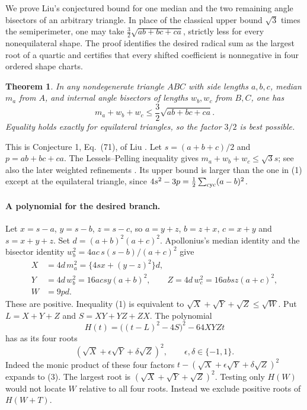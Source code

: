 \documentclass[11pt,a4paper]{article}
\numberwithin{equation}{section}
\newtheorem{theorem}{Theorem}[section]
\theoremstyle{definition}
\theoremstyle{remark}
\newenvironment{sectionabstract}{\par\smallskip\begingroup\small\noindent}{\par\endgroup\medskip}
\begin{document}
\begin{sectionabstract}
We prove Liu's conjectured bound for one median and the two remaining angle bisectors of an arbitrary triangle. In place of the classical upper bound $\sqrt3$ times the semiperimeter, one may take $\tfrac32\sqrt{ab+bc+ca}$, strictly less for every nonequilateral shape. The proof identifies the desired radical sum as the largest root of a quartic and certifies that every shifted coefficient is nonnegative in four ordered shape charts.
\end{sectionabstract}

\begin{theorem}
In any nondegenerate triangle $ABC$ with side lengths $a,b,c$, median $m_a$ from $A$, and internal angle bisectors of lengths $w_b,w_c$ from $B,C$, one has
\[
 m_a+w_b+w_c\le\frac32\sqrt{ab+bc+ca}.
 \tag{1}
\]
Equality holds exactly for equilateral triangles, so the factor $3/2$ is best possible.
\end{theorem}
This is Conjecture 1, Eq.~(71), of Liu \cite[p.~1373]{r40meiji:liu}. Let $s=(a+b+c)/2$ and $p=ab+bc+ca$. The Lessels--Pelling inequality \cite{r40meiji:lp} gives $m_a+w_b+w_c\le\sqrt3s$; see also the later weighted refinements \cite{r40meiji:bd}. Its upper bound is larger than the one in (1) except at the equilateral triangle, since $4s^2-3p=\tfrac12\sum_{\rm cyc}(a-b)^2$.

\paragraph{A polynomial for the desired branch.}
Let $x=s-a$, $y=s-b$, $z=s-c$, so $a=y+z$, $b=z+x$, $c=x+y$ and $s=x+y+z$. Set $d=(a+b)^2(a+c)^2$. Apollonius's median identity and the bisector identity $w_b^2=4ac\,s(s-b)/(a+c)^2$ give
\[
\begin{aligned}
 X&=4d\,m_a^2=\{4sx+(y-z)^2\}d,\\
 Y&=4d\,w_b^2=16acsy(a+b)^2,\qquad
 Z=4d\,w_c^2=16absz(a+c)^2,\\
 W&=9pd .
\end{aligned}
\tag{2}
\]
These are positive. Inequality (1) is equivalent to $\sqrt X+\sqrt Y+\sqrt Z\le\sqrt W$. Put $L=X+Y+Z$ and $S=XY+YZ+ZX$. The polynomial
\[
 H(t)=\bigl((t-L)^2-4S\bigr)^2-64XYZt \tag{3}
\]
has as its four roots
\[
 (\sqrt X+\epsilon\sqrt Y+\delta\sqrt Z)^2,\qquad \epsilon,\delta\in\{-1,1\} .
\]
Indeed the monic product of these four factors $t-(\sqrt X+\epsilon\sqrt Y+\delta\sqrt Z)^2$ expands to (3). The largest root is $(\sqrt X+\sqrt Y+\sqrt Z)^2$. Testing only $H(W)$ would not locate $W$ relative to all four roots. Instead we exclude positive roots of $H(W+T)$.
\end{document}
